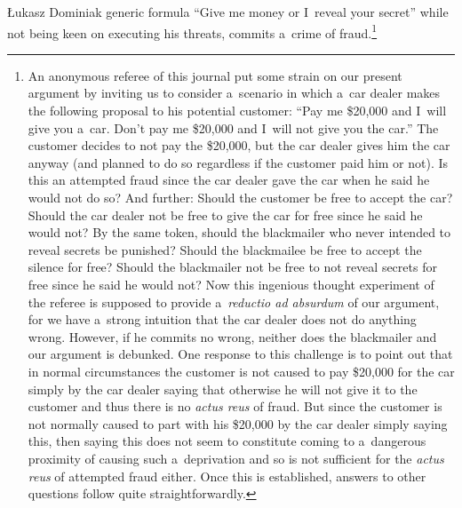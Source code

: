 \begin{artengenv}{Łukasz Dominiak}
 generic formula ``Give me money or I~reveal your secret'' while not being keen on executing his threats, commits a~crime of fraud.\footnote{An anonymous referee of this journal put some strain on our present argument by inviting us to consider a~scenario in which a~car dealer makes the following proposal to his potential customer: ``Pay me \$20,000 and I~will give you a~car. Don't pay me \$20,000 and I~will not give you the car.'' The customer decides to not pay the \$20,000, but the car dealer gives him the car anyway (and planned to do so regardless if the customer paid him or not). Is this an attempted fraud since the car dealer gave the car when he said he would not do so? And further: Should the customer be free to accept the car? Should the car dealer not be free to give the car for free since he said he would not? By the same token, should the blackmailer who never intended to reveal secrets be punished? Should the blackmailee be free to accept the silence for free? Should the blackmailer not be free to not reveal secrets for free since he said he would not? Now this ingenious thought experiment of the referee is supposed to provide a~\textit{reductio ad absurdum} of our argument, for we have a~strong intuition that the car dealer does not do anything wrong. However, if he commits no wrong, neither does the blackmailer and our argument is debunked. One response to this challenge is to point out that in normal circumstances the customer is not caused to pay \$20,000 for the car simply by the car dealer saying that otherwise he will not give it to the customer and thus there is no \textit{actus reus} of fraud. But since the customer is not normally caused to part with his \$20,000 by the car dealer simply saying this, then saying this does not seem to constitute coming to a~dangerous proximity of causing such a~deprivation and so is not sufficient for the \textit{actus reus} of attempted fraud either. Once this is established, answers to other questions follow quite straightforwardly.}




\end{artengenv}
